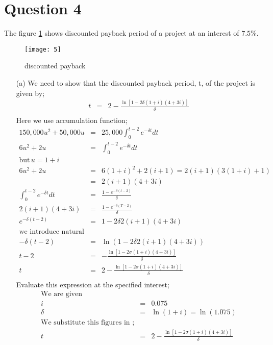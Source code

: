 \documentclass[12pt,a4paper]{article}
\begin{document}
\section*{Question 4}
The figure \ref{fig 6} shows discounted payback period of a project at an interest of $7.5 \%$.
\begin{figure}[H]
\texttt{[image: 5]}
\centering
\caption{discounted payback}
\label{fig 6}
\end{figure}
\begin{enumerate}
\item[(a)]
We need to show that the discounted payback period, t,
of the project is given by;
\begin{eqnarray*}
t&=& 2-\frac{\ln \left[1-2\delta(1+i)(4+3i) \right]}{\delta}\\
\end{eqnarray*}
Here we use accumulation function;
\begin{eqnarray*}
150,000 u^2+50,000 u&=&25,000 \int _0 ^{t-2} e^{-\delta t}dt\\
6 u^2+2 u&= &\int _0 ^{t-2} e^{-\delta t }dt\\
\text{but} \, u=1+i\\
6u^2+2u&=& 6(1+i)^2+2(i+1)= 2(i+1)(3(1+i)+1)\\
&=& 2(i+1)(4+3i)\\
\int _0 ^{t-2} e^{-\delta t}dt&=&\frac{1-e^{-\delta(t-2)}}{\delta}\\
 2(i+1)(4+3i)&=& \frac{1-e^{-\delta(T-2)}}{\delta}\\
 e^{-\delta(t-2)}&=&1-2 \delta  2(i+1)(4+3i)\\
 \text{we introduce natural log on both sides to obtain; }\\
 -\delta(t-2)&=& \ln(1-2 \delta  2(i+1)(4+3i))\\
 t-2 &=& -\frac{\ln \left[1-2\sigma(1+i)(4+3i) \right]}{\delta}\\
 t&=& 2-\frac{\ln \left[1-2\sigma(1+i)(4+3i) \right]}{\delta}\\
\end{eqnarray*}
\newpage
Evaluate this expression at the specified interest;
\begin{eqnarray*}
\text{We are given}\\
i&=& 0.075\\
\delta &=& \ln (1+i)= \ln (1.075)\\
\text{We substitute this figures in ;}\\
 t&=& 2-\frac{\ln \left[1-2\sigma(1+i)(4+3i) \right]}{\delta}\\

\end{eqnarray*}
\end{enumerate}
\end{document}
